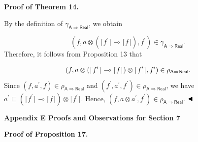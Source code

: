  
 
 
\par\medskip\noindent\textbf{Proof of Theorem 14.}\par
 
 
By the definition of $\gamma_{\mathsf{A}\Rightarrow\mathsf{Real}}$, we obtain\par
    \[(f,a\otimes(\lceil f^{\prime}\rceil\multimap\lceil f\rceil),f^{\prime})\in%
\gamma_{\mathsf{A}\Rightarrow\mathsf{Real}}.\]    
Therefore, it follows from Proposition 13 that\par
    \[(f,a\otimes(\lceil f^{\prime}\rceil\multimap\lceil f\rceil)\otimes\lceil f^{%
\prime}\rceil,f^{\prime})\in\rho_{\mathsf{A}\Rightarrow\mathsf{Real}}.\]    
Since $(f,a^{\prime},f)\in\rho_{\mathsf{A}\Rightarrow\mathsf{Real}}$ and $(f^{\prime},a^{\prime},f^{\prime})\in\rho_{\mathsf{A}\Rightarrow\mathsf{Real}}$, we have $a^{\prime}\sqsubseteq(\lceil f^{\prime}\rceil\multimap\lceil f\rceil)\otimes%
\lceil f^{\prime}\rceil$. Hence, $(f,a\otimes a^{\prime},f^{\prime})\in\rho_{\mathsf{A}\Rightarrow\mathsf{Real}}$. $\hfill\blacktriangleleft$\par
 
 
 


 
\par\medskip\noindent\textbf{Appendix E Proofs and Observations for Section 7}\par
 
 
\par\medskip\noindent\textbf{Proof of Proposition 17.}\par
 
 
